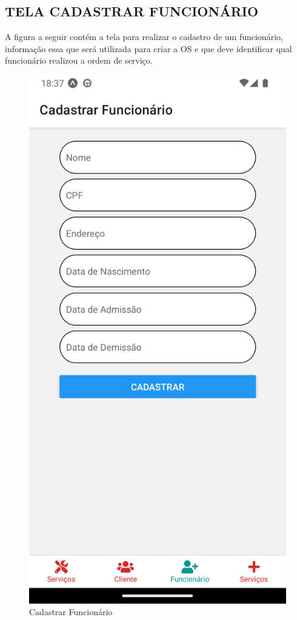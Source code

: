 \subsection{TELA CADASTRAR FUNCIONÁRIO}
A figura a seguir contém a tela para realizar o cadastro de um funcionário, informação essa que será utilizada para criar a OS e que deve identificar qual funcionário realizou a ordem de serviço.
\begin{figure}[htb]
	\caption{\label{fig_diagrama-classes} Cadastrar Funcionário}
	\begin{center}
	    \includegraphics[width=0.5\linewidth]{imagens/tela-cadastrar-funcionario.png}
	\end{center}
\end{figure}

\newpage

